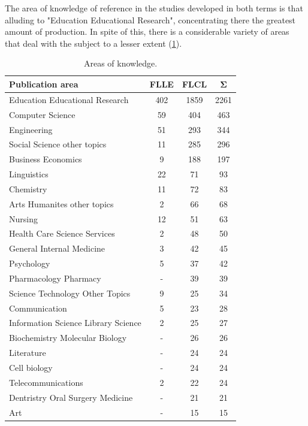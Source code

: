 \documentclass{textolivre-html}
\begin{document}
The area of knowledge of reference in the studies developed in both terms is that alluding to "Education Educational Research", concentrating there the greatest amount of production. In spite of this, there is a considerable variety of areas that deal with the subject to a lesser extent (\cref{tbl-tabela-05}).

\begin{table}[htpb]
\caption{Areas of knowledge.}
\label{tbl-tabela-05}
\centering
\begin{tabular}{lccc}
\toprule
\textbf{Publication area} & \textbf{FLLE} & \textbf{FLCL} & \textbf{Σ} \\ 
\midrule
Education Educational Research      & 402 & 1859 & 2261 \\ 
Computer Science                    & 59  & 404  & 463  \\ 
Engineering                         & 51  & 293  & 344  \\ 
Social Science other topics         & 11  & 285  & 296  \\ 
Business Economics                  & 9   & 188  & 197  \\ 
Linguistics                         & 22  & 71   & 93   \\ 
Chemistry                           & 11  & 72   & 83   \\ 
Arts Humanites other topics         & 2   & 66   & 68   \\ 
Nursing                             & 12  & 51   & 63   \\ 
Health Care Science Services        & 2   & 48   & 50   \\ 
General Internal Medicine           & 3   & 42   & 45   \\ 
Psychology                          & 5   & 37   & 42   \\ 
Pharmacology Pharmacy               & -   & 39   & 39   \\ 
Science Technology Other Topics     & 9   & 25   & 34   \\ 
Communication                       & 5   & 23   & 28   \\ 
Information Science Library Science & 2   & 25   & 27   \\ 
Biochemistry Molecular Biology      & -   & 26   & 26   \\ 
Literature                          & -   & 24   & 24   \\ 
Cell biology                        & -   & 24   & 24   \\ 
Telecommunications                  & 2   & 22   & 24   \\ 
Dentristry Oral Surgery Medicine    & -   & 21   & 21   \\ 
Art                                 & -   & 15   & 15   \\ 
\bottomrule
\end{tabular}
\end{table}
\end{document}
